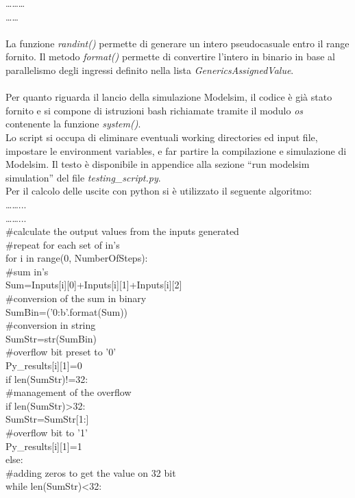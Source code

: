 ………\\
……\\
\\
La funzione \textit{randint()} permette di generare un intero pseudocasuale entro il range fornito.
Il metodo \textit{format()} permette di convertire l’intero in binario in base al parallelismo degli ingressi definito nella lista \textit{GenericsAssignedValue}.\\
\\
Per quanto riguarda il lancio della simulazione Modelsim, il codice è già stato fornito e si compone di istruzioni bash richiamate tramite il modulo \textit{os} contenente la funzione \textit{system()}.
\\
Lo script si occupa di eliminare eventuali working directories ed input file, impostare le environment variables, e far partire la compilazione e simulazione di Modelsim.
Il testo è disponibile in appendice alla sezione “run modelsim simulation” del file \textit{testing\_script.py}.
\\
Per il calcolo delle uscite con python si è utilizzato il seguente algoritmo:\\
……...\\
……...\\
\#calculate the output values from the inputs generated\\
\#repeat for each set of in's\\
for i in range(0, NumberOfSteps):\\  
\#sum in's\\
Sum=Inputs[i][0]+Inputs[i][1]+Inputs[i][2]\\
\#conversion of the sum in binary\\
SumBin=('{0:b}'.format(Sum))\\
\#conversion in string \\
SumStr=str(SumBin)\\
\#overflow bit preset to '0'\\
Py\_results[i][1]=0 \\
if len(SumStr)!=32:\\
\#management of the overflow\\
if len(SumStr)>32:    \\
SumStr=SumStr[1:]\\
\#overflow bit to '1'\\
Py\_results[i][1]=1\\
else:\\
\#adding zeros to get the value on 32 bit\\
while len(SumStr)<32:  \\
